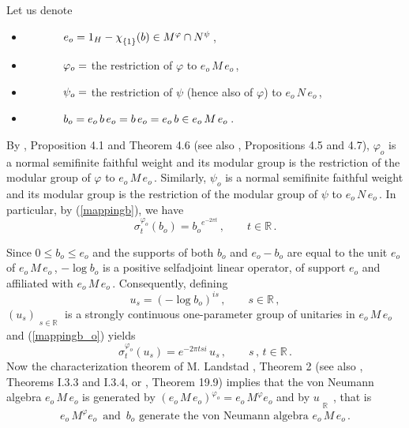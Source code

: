 \documentclass[reqno]{amsart}
\theoremstyle{definition}
\theoremstyle{remark}
\numberwithin{equation}{section}
\theoremstyle{plain}
\begin{document}
Let us denote
\begin{itemize}
\item[] $\hspace{1.2 cm}e_o =1_H -\chi_{\substack{{}\\{\{ 1\}}}} (b)
\in M^\varphi \cap N^\psi\,$,
\item[] $\hspace{1.2 cm}\varphi_o =$ the restriction of $\varphi$ to
$e_o\, M\, e_o\,$,
\item[] $\hspace{1.2 cm}\psi_o =$ the restriction of $\psi$ (hence
also of $\varphi$) to $e_o\, N\, e_o\,$,
\item[] $\hspace{1.2 cm}b_o =e_o\, b\, e_o =b\, e_o =e_o\, b
\in e_o\, M\, e_o\,$.
\end{itemize}
\smallskip
\noindent By \cite{P-T}, Proposition 4.1 and Theorem 4.6
(see also \cite{S}, Propositions 4.5 and 4.7), $\varphi_o$ is a
normal semifinite faithful weight and its modular group is the
restriction of the modular group of $\varphi$ to $e_o\, M\, e_o\,$.
Similarly, $\psi_o$ is a normal semifinite faithful weight and
its modular group is the restriction of the modular group of
$\psi$ to $e_o\, N\, e_o\,$.
In particular, by (\ref{mappingb}), we have
\begin{equation}\label{mappingb_o}
\sigma^{\varphi_o}_t (b_o)= {b_o}^{e^{-2\pi t}}\, ,\qquad
t\in\mathbb R\, .
\end{equation}

Since $0\leq b_o\leq e_o$ and the supports of both $b_o$ and
$e_o -b_o$ are equal to the unit $e_o$ of $e_o\, M\, e_o\,$,
$-\log b_o$ is a positive selfadjoint linear operator, of support
$e_o$ and affiliated with $e_o\, M\, e_o\,$. Consequently, defining
\begin{equation*}
u_s =(-\log b_o )^{i s}\, ,\qquad s\in\mathbb R\, ,
\end{equation*}
$(u_s)_{\substack{{}\\{s\in\mathbb R}}}$ is a strongly continuous
one-parameter group of unitaries in $e_o\, M\, e_o$ and
(\ref{mappingb_o}) yields
\begin{equation*}%
\sigma^{\varphi_o}_t (u_s) =e^{-2\pi tsi}\, u_s\, ,\qquad s
\, ,\, t\in \mathbb R\, .
\end{equation*}
Now the characterization theorem of M. Landstad \cite{La}, Theorem 2
(see also \cite{S-V-Z}, Theorems I.3.3 and I.3.4, or \cite{S},
Theorem 19.9) implies that the von Neumann algebra $e_o\, M\, e_o$
is generated by $(e_o\, M\, e_o)^{\varphi_o} =e_o\, M^\varphi e_o$
and by $u_{\substack{{}\\ {\mathbb R}}}\,$, that is
\begin{equation}\label{Land}
e_o\, M^\varphi e_o\,\text{ and }\, b_o
\text{ generate the von Neumann algebra }e_o\, M\, e_o\, .
\end{equation}
\end{document}
